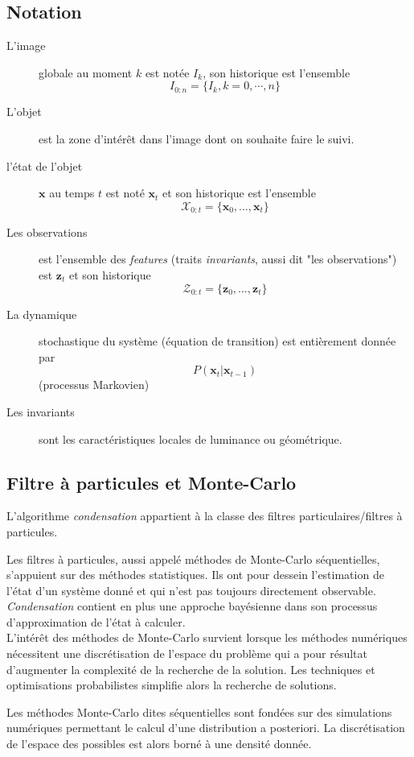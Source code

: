 \documentclass[a4paper,12pt]{report}
\begin{document}
\subsection{Notation}
\begin{description}
\item[L'image] globale au moment $k$ est notée $I_k$, son historique est l'ensemble $$I_{0:n}=\{I_k, k=0,\cdots,n\}$$
\item[L'objet] est la zone d'intérêt dans l'image dont on souhaite faire le suivi.
\item[l'état de l'objet] $\mathbf{x}$ au temps $t$ est noté $\mathbf{x}_t$ et son historique est l'ensemble $$\mathcal{X}_{0:t} = \{\mathbf{x}_0,...,\mathbf{x}_t\}$$
\item[Les observations] est l'ensemble des \textit{features} (traits \textit{invariants}, aussi dit "les observations") est $\mathbf{z}_t$ et son historique $$ \mathcal{Z}_{0:t}=\{\mathbf{z}_0,...,\mathbf{z}_t\}$$
\item[La dynamique] stochastique du système (équation de transition) est entièrement donnée par $$P(\mathbf{x}_t|\mathbf{x}_{t-1})$$ (processus Markovien)
\item[Les invariants] sont les caractéristiques locales de luminance ou géométrique.
\end{description}

\subsection{Filtre à particules et Monte-Carlo}
L'algorithme \textit{condensation} appartient à la classe des filtres particulaires/filtres à particules. 

Les filtres à particules, aussi appelé méthodes  de Monte-Carlo séquentielles, s'appuient sur des méthodes statistiques. Ils ont pour dessein l'estimation de l'état d'un système donné et qui n'est pas toujours directement observable.
\textit{Condensation} contient en plus une approche bayésienne dans son processus d'approximation de l'état à calculer.\\

L'intérêt des méthodes de Monte-Carlo survient lorsque les méthodes numériques nécessitent une discrétisation de l'espace du problème qui a pour résultat d'augmenter la complexité de la recherche de la solution. Les techniques et optimisations probabilistes simplifie alors la recherche de solutions.

Les méthodes Monte-Carlo dites séquentielles sont fondées sur des simulations numériques permettant le calcul d'une distribution a posteriori. La discrétisation de l'espace des possibles est alors borné à une densité donnée.\\
\end{document}
